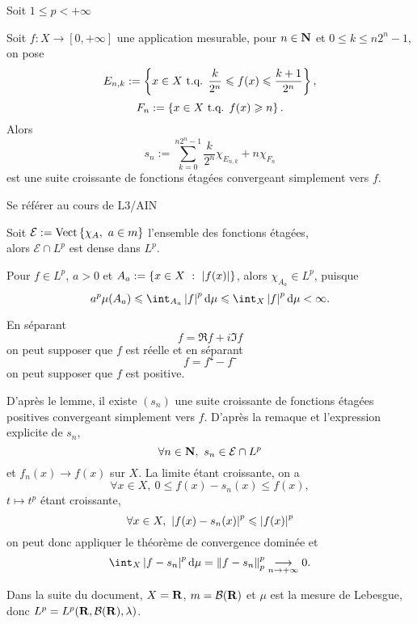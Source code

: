 \documentclass[a4paper,11pt, twoside]{article}
\begin{document}


Soit $1\leqslant p<+\infty$


\begin{lemme}
  Soit $f:X\longrightarrow[0,+\infty]$ une application mesurable, pour $n\in\mathbf N$ et $0\leqslant k\leqslant n2^n-1$, on pose 
  $$E_{n,k}:=\left\{x\in X\text{ t.q. }\frac{k}{2^n}\leqslant f(x)\leqslant \frac{k+1}{2^n}\right\},$$
  $$F_n:=\left\{x\in X\text{ t.q. } f(x)\geqslant n\right\}.$$
  Alors
  $$s_n:=\sum_{k=0}^{n2^n-1}\frac{k}{2^n}\chi_{E_{n,k}}+n\chi_{F_n}$$
  est une suite croissante de fonctions étagées convergeant simplement vers $f$.
\end{lemme}


\begin{Proof}
  Se référer au cours de L3/AIN
\end{Proof}

\begin{corollaire}
  Soit $\mathcal E:=\mathrm{Vect}\left\{\chi_A,\ a\in m\right\}$ l'ensemble des fonctions étagées,\\

  alors $\mathcal E\cap L^p$ est dense dans $L^p$.
\end{corollaire}


\begin{RQ}
  Pour $f\in L^p$, $a>0$ et $A_a:=\left\{x\in X\ :\ \left| f(x)\right|\right\}$, alors $\chi_{A_a}\in L^p$, puisque 
  $$a^p\mu(A_a)\leqslant\int_{A_a}\abs{f}^p\mathrm d\mu\leqslant \int_{X}\abs{f}^p\mathrm d\mu<\infty.$$
\end{RQ}


\begin{Proof}
  En séparant 
  $$f=\Re f+i\Im f$$
  on peut supposer que $f$ est réelle et en séparant 
  $$f=f⁺-f⁻$$
  on peut supposer que $f$ est positive.

  D'après le lemme, il existe $(s_n)$ une suite croissante de fonctions étagées positives convergeant simplement vers $f$. D'après la remaque et l'expression explicite de $s_n$, 
  $$\forall n\in\mathbf N,\ s_n\in \mathcal E\cap L^p$$
  et $f_n(x)\longrightarrow f(x)$ sur $X$. 
  La limite étant croissante, on a 
  $$\forall x\in X,\ 0\leqslant f(x)-s_n(x)\leqslant f(x),$$
  $t\mapsto t^p$ étant croissante,
  $$\forall x\in X,\ \abs{f(x)-s_n(x)}^p\leqslant \abs{f(x)}^p$$
  on peut donc appliquer le théorème de convergence dominée et 
  $$\int_X\abs{f-s_n}^p\mathrm d\mu=\norm{f-s_n}_p^p\tend 0.$$
\end{Proof}


Dans la suite du document, $X=\mathbf R$, $m=\mathcal B(\mathbf R)$ et $\mu$ est la mesure de Lebesgue, donc $L^p=L^p(\mathbf R,\mathcal B(\mathbf R),\lambda)$.
\end{document}
